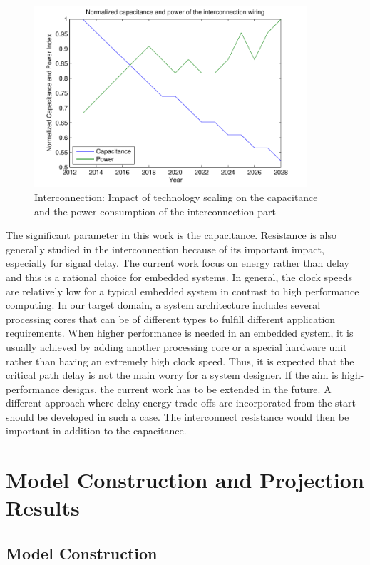  \begin{figure}
 \centering
 \includegraphics[width =0.9\textwidth]{E/intpower.pdf}
  \caption{Interconnection: Impact of technology scaling on the capacitance and the power consumption of the interconnection part}
 \label{fig:intpowerE}
 \end{figure}
 
The significant parameter in this work is the capacitance.
Resistance is also generally studied in the interconnection because of its important impact, especially for signal
delay. 
The current work focus on energy rather than delay and this is a rational choice for embedded systems.
In general, the clock speeds are relatively low for a typical embedded system in contrast to high performance computing.
In our target domain, a system architecture includes several processing cores that can be of different types to fulfill different application requirements.
When higher performance is needed in an embedded system, it is usually achieved by adding another processing core or a special hardware unit rather than having an extremely high clock speed.
Thus, it is expected that the critical path delay is not the main worry for a system designer.
If the aim is high-performance designs, the current work has to be extended in the future.
A different approach where delay-energy trade-offs are incorporated
from the start should be developed in such a case. The interconnect resistance would then be important in addition to the capacitance.

\section{Model Construction and Projection Results}
\label{resultsE}

\subsection{Model Construction}


